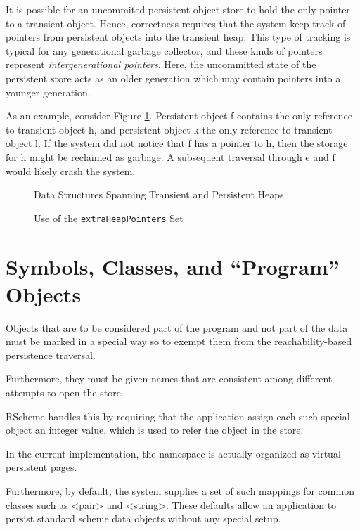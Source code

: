 \documentclass[10pt,letterpaper]{article}
\begin{document}
It is possible for an uncommited persistent object store to hold the
only pointer to a transient object.  Hence, correctness requires that
the system keep track of pointers from persistent objects into the
transient heap.  This type of tracking is typical for any generational
garbage collector, and these kinds of pointers represent
\emph{intergenerational pointers}.  Here, the
uncommitted state of the persistent store acts as an older generation
which may contain pointers into a younger generation.

As an example, consider Figure \ref{fig.intergen}.  Persistent
object f contains the only reference to transient object h, and
persistent object k the only reference to transient object l.  If the
system did not notice that f has a pointer to h, then the storage for
h might be reclaimed as garbage.  A subsequent traversal through e and
f would likely crash the system.

\begin{figure}
\centering
{}
\caption{Data Structures Spanning Transient and Persistent Heaps}
\label{fig.intergen}
\end{figure}

\begin{figure}
\centering
{}
\caption{Use of the \texttt{extraHeapPointers} Set}
\end{figure}


\section{Symbols, Classes, and ``Program'' Objects}

Objects that are to be considered part of the program and not
part of the data must be marked in a special way so to exempt
them from the reachability-based persistence traversal.

Furthermore, they must be given names that are consistent among
different attempts to open the store.


RScheme handles this by requiring that the application assign each
such special object an integer value, which is used to refer the
object in the store.

In the current implementation, the namespace is
actually organized as virtual persistent pages.

Furthermore, by default, the system supplies a set of such
mappings for common classes such as <pair> and <string>.  These
defaults allow an application to persist standard scheme data
objects without any special setup.
\end{document}
